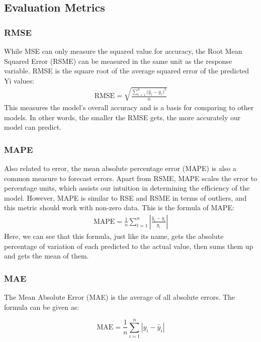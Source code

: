 \documentclass{ieeeojies}
\begin{document}
\subsection{Evaluation Metrics}
\subsubsection{RMSE}
While MSE can only measure the squared value for accuracy, the Root Mean Squared Error (RSME) can be measured in the same unit as the response variable. RMSE is the square root of the average squared error of the predicted Yi values:
\begin{align*}
    \text{RMSE} = \sqrt{\frac{\sum_{i=1}^{n} \big(\hat{y}_i - y_i\big)^2}{n}}
\end{align*}
This measures the model's overall accuracy and is a basis for comparing to other models. In other words, the smaller the RMSE gets, the more accurately our model can predict.

\subsubsection{MAPE}
Also related to error, the mean absolute percentage error (MAPE) is also a common measure to forecast errors. Apart from RSME, MAPE scales the error to percentage units, which assists our intuition in determining the efficiency of the model. However, MAPE is similar to RSE and RSME in terms of outliers, and this metric should work with non-zero data. This is the formula of MAPE:
\begin{align*}
    \text{MAPE} = \frac{1}{n} \sum_{t=1}^{n} \left| \frac{\hat{y}_i - y_i}{y_i} \right|
\end{align*}
Here, we can see that this formula, just like its name, gets the absolute percentage of variation of each predicted to the actual value, then sums them up and gets the mean of them.

\subsubsection{MAE}

The Mean Absolute Error (MAE) is the average of all absolute errors. The formula can be given as:

\[
\text{MAE} = \frac{1}{n} \sum_{i=1}^{n} \left| y_i - \hat{y}_i \right|
\]
\end{document}
